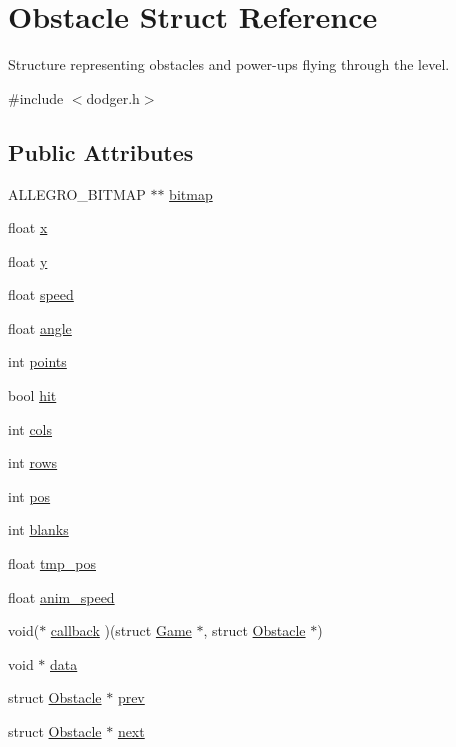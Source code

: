 \hypertarget{structObstacle}{\section{Obstacle Struct Reference}
\label{structObstacle}
}


Structure representing obstacles and power-\/ups flying through the level.  




{\ttfamily \#include $<$dodger.\+h$>$}

\subsection*{Public Attributes}
\begin{DoxyCompactItemize}
\item 
A\+L\+L\+E\+G\+R\+O\+\_\+\+B\+I\+T\+M\+A\+P $\ast$$\ast$ \hyperlink{structObstacle_a1f35f88fe8f6d0664da082f82ae4b774}{bitmap}
\item 
float \hyperlink{structObstacle_ad9cd25e0032f6692a4f93a057ccdfd85}{x}
\item 
float \hyperlink{structObstacle_af4b6f012014e2fa5aef193330f70fdef}{y}
\item 
float \hyperlink{structObstacle_a1e2b46db05325273ce0fcba3550b5b2a}{speed}
\item 
float \hyperlink{structObstacle_a99d85ef4e92f7e899b49ac85b2e1dbdc}{angle}
\item 
int \hyperlink{structObstacle_a38a164a0e4d6f6508fb65c6eff39147f}{points}
\item 
bool \hyperlink{structObstacle_ac89d025f4ad7c2f083d262c1bee4e851}{hit}
\item 
int \hyperlink{structObstacle_ad51aa07361c732a47e78c80fae2fab7c}{cols}
\item 
int \hyperlink{structObstacle_aab33c9d4c0f05d02fda4e77cff7d7e72}{rows}
\item 
int \hyperlink{structObstacle_a5228dff4dc773a66043e822fb4d6d00c}{pos}
\item 
int \hyperlink{structObstacle_a862f4038bd63057d91406720bb586a9c}{blanks}
\item 
float \hyperlink{structObstacle_afd620c4c3496cd6f84184dcda4ca7611}{tmp\+\_\+pos}
\item 
float \hyperlink{structObstacle_a96a13e4704e4643291989193a112366a}{anim\+\_\+speed}
\item 
void($\ast$ \hyperlink{structObstacle_a21b4ff0edaa2dc5394ff7a6328e48358}{callback} )(struct \hyperlink{structGame}{Game} $\ast$, struct \hyperlink{structObstacle}{Obstacle} $\ast$)
\item 
void $\ast$ \hyperlink{structObstacle_a88728e624cc62993e2bf52aff816cdff}{data}
\item 
struct \hyperlink{structObstacle}{Obstacle} $\ast$ \hyperlink{structObstacle_a13bc07b730f58d5b1c3db68e8e4aca27}{prev}
\item 
struct \hyperlink{structObstacle}{Obstacle} $\ast$ \hyperlink{structObstacle_aedbcf65351fa59ca9f18f6fba0287dc1}{next}
\end{DoxyCompactItemize}


